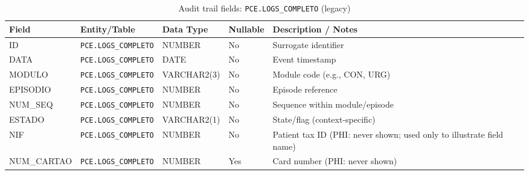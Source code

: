 \begin{table}[H]
    \centering
    \caption{Audit trail fields: \texttt{PCE.LOGS\_COMPLETO} (legacy)}
    \label{tab:audit_logs_completo_fields}
    {\setlength{\tabcolsep}{3pt}\scriptsize\renewcommand{\arraystretch}{1.15}
    \begin{tabularx}{\textwidth}{@{}>{\raggedright\arraybackslash}p{3.2cm} >{\raggedright\arraybackslash}p{3.0cm} >{\raggedright\arraybackslash}p{2.2cm} >{\centering\arraybackslash}p{1.7cm} >{\raggedright\arraybackslash}X@{}}
        \toprule
        \textbf{Field} & \textbf{Entity/Table} & \textbf{Data Type} & \textbf{Nullable} & \textbf{Description / Notes} \\
        \midrule
        ID & \texttt{PCE.LOGS\_COMPLETO} & NUMBER & No & Surrogate identifier \\
        DATA & \texttt{PCE.LOGS\_COMPLETO} & DATE & No & Event timestamp \\
        MODULO & \texttt{PCE.LOGS\_COMPLETO} & VARCHAR2(3) & No & Module code (e.g., CON, URG) \\
        EPISODIO & \texttt{PCE.LOGS\_COMPLETO} & NUMBER & No & Episode reference \\
        NUM\_SEQ & \texttt{PCE.LOGS\_COMPLETO} & NUMBER & No & Sequence within module/episode \\
        ESTADO & \texttt{PCE.LOGS\_COMPLETO} & VARCHAR2(1) & No & State/flag (context-specific) \\
        NIF & \texttt{PCE.LOGS\_COMPLETO} & NUMBER & No & Patient tax ID (PHI: never shown; used only to illustrate field name) \\
        NUM\_CARTAO & \texttt{PCE.LOGS\_COMPLETO} & NUMBER & Yes & Card number (PHI: never shown) \\
        \bottomrule
    \end{tabularx}}
\end{table}

